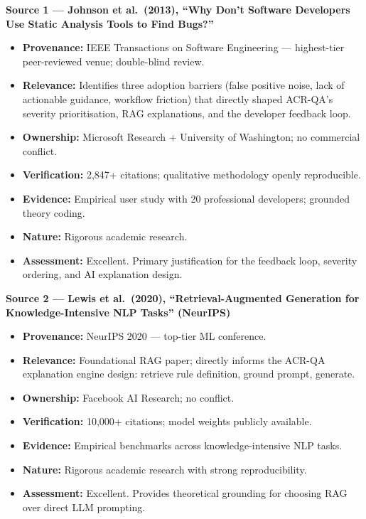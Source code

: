 \documentclass[12pt,a4paper]{article}
\begin{document}
\medskip
\noindent\textbf{Source 1 --- Johnson et al.\ (2013), ``Why Don't Software
Developers Use Static Analysis Tools to Find Bugs?''}

\begin{itemize}[leftmargin=1.5em,itemsep=2pt]
  \item \textbf{Provenance:} IEEE Transactions on Software Engineering ---
  highest-tier peer-reviewed venue; double-blind review.
  \item \textbf{Relevance:} Identifies three adoption barriers (false positive
  noise, lack of actionable guidance, workflow friction) that directly shaped
  ACR-QA's severity prioritisation, RAG explanations, and the developer
  feedback loop.
  \item \textbf{Ownership:} Microsoft Research + University of Washington;
  no commercial conflict.
  \item \textbf{Verification:} 2,847+ citations; qualitative methodology
  openly reproducible.
  \item \textbf{Evidence:} Empirical user study with 20 professional developers;
  grounded theory coding.
  \item \textbf{Nature:} Rigorous academic research.
  \item \textbf{Assessment:} Excellent.  Primary justification for the feedback
  loop, severity ordering, and AI explanation design.
\end{itemize}

\medskip
\noindent\textbf{Source 2 --- Lewis et al.\ (2020), ``Retrieval-Augmented
Generation for Knowledge-Intensive NLP Tasks'' (NeurIPS)}

\begin{itemize}[leftmargin=1.5em,itemsep=2pt]
  \item \textbf{Provenance:} NeurIPS 2020 --- top-tier ML conference.
  \item \textbf{Relevance:} Foundational RAG paper; directly informs the ACR-QA
  explanation engine design: retrieve rule definition, ground prompt, generate.
  \item \textbf{Ownership:} Facebook AI Research; no conflict.
  \item \textbf{Verification:} 10,000+ citations; model weights publicly available.
  \item \textbf{Evidence:} Empirical benchmarks across knowledge-intensive NLP tasks.
  \item \textbf{Nature:} Rigorous academic research with strong reproducibility.
  \item \textbf{Assessment:} Excellent.  Provides theoretical grounding for choosing
  RAG over direct LLM prompting.
\end{itemize}
\end{document}
